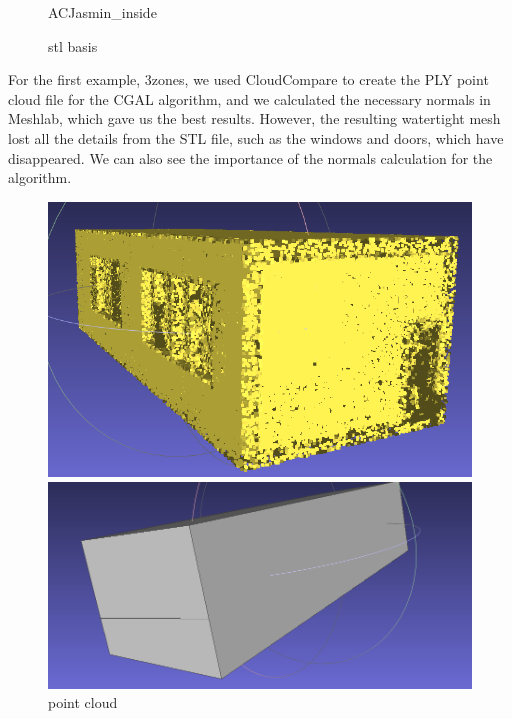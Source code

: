 \documentclass{article}
\begin{document}
\begin{figure}[H]
\begin{minipage}[t]{0.27\textwidth}
    \caption*{ACJasmin\_inside}
  \end{minipage}
  \caption{stl basis}
\end{figure}  

For the first example, 3zones, 
we used CloudCompare to create the PLY point cloud file for the CGAL algorithm, 
and we calculated the necessary normals in Meshlab, which gave us the best results. 
However, the resulting watertight mesh lost all the details from the STL file,
such as the windows and doors, which have disappeared.
We can also see the importance of the normals calculation for the algorithm.

\vspace{0.5cm}
\begin{figure}[H]
  \centering
  \begin{minipage}[t]{0.29\textwidth}
    \includegraphics[width=\textwidth]{../../images/screen_kinetic/3zones_point_cloud.png}
    \caption*{point cloud}
  \end{minipage}
  \hspace{0.05\textwidth}
  \begin{minipage}[t]{0.29\textwidth}
    \includegraphics[width=\textwidth]{../../images/screen_kinetic/3zones_result_normal5_cgal.png}

\end{minipage}
\end{figure}
\end{document}
